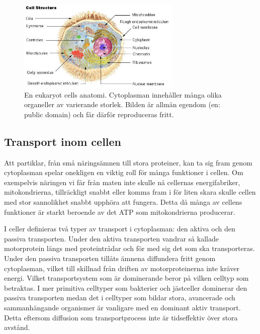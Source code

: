 \begin{figure}\centering
\includegraphics[width=0.7\textwidth]{bilder/Illu_cell_structure.jpg}
\caption{En eukaryot cells anatomi. Cytoplasman innehåller många olika organeller av varierande storlek. \footnotesize Bilden är allmän egendom\cite{wiki:illu_cell_structure} (en: public domain) och får därför reproduceras fritt.}
\label{fig:cell_struktur}
\end{figure}


\subsection{Transport inom cellen}

Att partiklar, från små näringsämnen till stora proteiner, kan ta sig fram genom cytoplasman spelar onekligen en viktig roll för många funktioner i cellen. Om exempelvis näringen vi får från maten inte skulle nå cellernas energifabriker, mitokondrierna, tillräckligt snabbt eller komma fram i för liten skara skulle cellen med stor sannolikhet snabbt upphöra att fungera. Detta då många av cellens funktioner är starkt beroende av det ATP som mitokondrierna\footnotemark{} producerar.

I celler definieras två typer av transport i cytoplasman: den aktiva och den passiva transporten. Under den aktiva transporten vandrar så kallade motorprotein längs med proteintrådar och för med sig det som ska transporteras. Under den passiva transporten tillåts ämnena diffundera fritt genom cytoplasman, vilket till skillnad från driften av motorproteinerna inte kräver energi. 
Vilket transportsystem som är dominerande beror på vilken celltyp som betraktas. I mer primitiva celltyper som bakterier och jästceller dominerar den passiva transporten medan det i celltyper som bildar stora, avancerade och sammanhängande organismer är vanligare med en dominant aktiv transport. Detta eftersom diffusion som transportprocess inte är tidseffektiv över stora avstånd.

